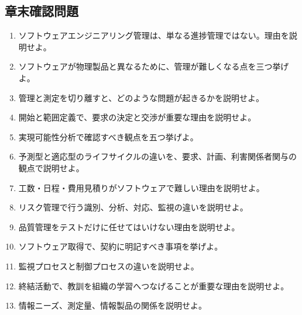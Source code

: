 \subsection{章末確認問題}
\begin{enumerate}[leftmargin=2em]
  \item ソフトウェアエンジニアリング管理は、単なる進捗管理ではない。理由を説明せよ。
  \item ソフトウェアが物理製品と異なるために、管理が難しくなる点を三つ挙げよ。
  \item 管理と測定を切り離すと、どのような問題が起きるかを説明せよ。
  \item 開始と範囲定義で、要求の決定と交渉が重要な理由を説明せよ。
  \item 実現可能性分析で確認すべき観点を五つ挙げよ。
  \item 予測型と適応型のライフサイクルの違いを、要求、計画、利害関係者関与の観点で説明せよ。
  \item 工数・日程・費用見積りがソフトウェアで難しい理由を説明せよ。
  \item リスク管理で行う識別、分析、対応、監視の違いを説明せよ。
  \item 品質管理をテストだけに任せてはいけない理由を説明せよ。
  \item ソフトウェア取得で、契約に明記すべき事項を挙げよ。
  \item 監視プロセスと制御プロセスの違いを説明せよ。
  \item 終結活動で、教訓を組織の学習へつなげることが重要な理由を説明せよ。
  \item 情報ニーズ、測定量、情報製品の関係を説明せよ。
\end{enumerate}
\begin{center}
\end{center}
